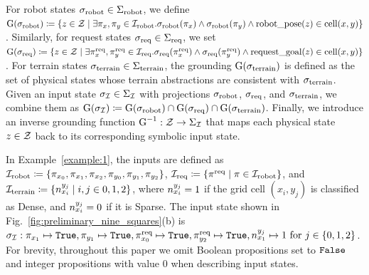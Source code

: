 For robot states $\sigma_{\textrm{robot}} \in \Sigma_{\textrm{robot}}$, we define 
$\textrm{G}(\sigma_{\textrm{robot}}) \coloneqq \{
z \in {\mathcal Z} \mid
\exists \pi_x, \pi_y \in {\mathcal I}_{\textrm{robot}}. 
\sigma_{\textrm{robot}}(\pi_x) \land \sigma_{\textrm{robot}}(\pi_y) \land
\textrm{robot\_pose}(z) \in \textrm{cell}(x,y)
\}$.
Similarly, for request states $\sigma_{\textrm{req}} \in \Sigma_{\textrm{req}}$, we set
$\textrm{G}(\sigma_{\textrm{req}}) \coloneqq \{
z \in {\mathcal Z} \mid
\exists \pi_x^\textrm{req}, \pi_y^\textrm{req} \in {\mathcal I}_{\textrm{req}}. 
\sigma_{\textrm{req}}(\pi_x^\textrm{req}) \land \sigma_{\textrm{req}}(\pi_y^\textrm{req}) \land
\textrm{request\_goal}(z) \in \textrm{cell}(x,y)
\}$. 
For terrain states $\sigma_{\textrm{terrain}} \in \Sigma_{\textrm{terrain}}$, the grounding $\textrm{G}(\sigma_{\textrm{terrain}})$ is defined as the set of physical states whose terrain abstractions are consistent with $\sigma_{\textrm{terrain}}$.
Given an input state $\sigma_{\mathcal I} \in \Sigma_{\mathcal I}$ with projections $\sigma_{\textrm{robot}}$, $\sigma_{\textrm{req}}$, and $\sigma_{\textrm{terrain}}$, we combine them as
$\textrm{G}(\sigma_{\mathcal I}) \coloneqq \textrm{G}(\sigma_{\textrm{robot}}) \cap \textrm{G}(\sigma_{\textrm{req}}) \cap \textrm{G}(\sigma_{\textrm{terrain}})$.
Finally, we introduce an inverse grounding function $\textrm{G}^{-1}: {\mathcal Z} \to \Sigma_{\mathcal I}$ that maps each physical state $z \in {\mathcal Z}$ back to its corresponding symbolic input state.


In Example~\ref{example:1}, the inputs are defined as
${\mathcal I}_{\textrm{robot}} \coloneqq
\{
\pi_{x_0}, \pi_{x_1}, \pi_{x_2},
\pi_{y_0}, \pi_{y_1}, \pi_{y_2}
\}$,
${\mathcal I}_{\textrm{req}} \coloneqq \{\pi^\textrm{req} \mid \pi \in {\mathcal I}_{\textrm{robot}}\}$,
and
${\mathcal I}_{\textrm{terrain}} \coloneqq \{n_{x_i}^{y_j} \mid i,j\in {0,1,2}\}$,
where $n_{x_i}^{y_j} = 1$ if the grid cell $(x_i, y_j)$ is classified as Dense, and $n_{x_i}^{y_j} = 0$ if it is Sparse.
The input state shown in Fig.~\ref{fig:preliminary_nine_squares}(b) is
$\sigma_{\mathcal I}:
\pi_{x_1} \mapsto {\tt{True}},
\pi_{y_1} \mapsto {\tt{True}},
\pi_{x_0}^\textrm{req} \mapsto {\tt{True}},
\pi_{y_2}^\textrm{req} \mapsto {\tt{True}},
n_{x_1}^{y_j} \mapsto 1 \ \text{for } j\in \{0,1,2\}$.
For brevity, throughout this paper we omit Boolean propositions set to ${\tt{False}}$ and integer propositions with value $0$ when describing input states.

